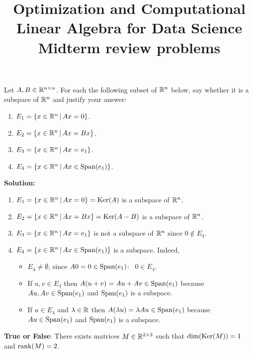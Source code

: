 \documentclass[11pt,nocut]{article}
\title{\vspace{-2.0cm}%
	Optimization and Computational Linear Algebra for Data Science\\
Midterm review problems}
\date{}
\begin{document}
\maketitle


\begin{problem}
	Let $A,B \in \mathbb{R}^{n \times n}$. For each the following subset of $\mathbb{R}^n$ below, say whether it is a subspace of $\mathbb{R}^n$ and justify your answer:
	\begin{enumerate}
		\item $E_1 = \{ x \in \mathbb{R}^n \, | \, Ax = 0 \}$.
		\item $E_2 = \{ x \in \mathbb{R}^n \, | \, Ax = Bx \}$.
		\item $E_3 = \{ x \in \mathbb{R}^n \, | \, Ax = e_1 \}$.
		\item $E_4 = \{ x \in \mathbb{R}^n \, | \, Ax \in {{\rm Span}}(e_1) \}$.
	\end{enumerate}
\end{problem}

\textbf{Solution:}
	\begin{enumerate}
		\item $E_1 = \{ x \in \mathbb{R}^n \, | \, Ax = 0 \} = {{\rm Ker}}(A)$ is a subspace of $\mathbb{R}^n$.
		\item $E_2 = \{ x \in \mathbb{R}^n \, | \, Ax = Bx \}= {{\rm Ker}}(A-B)$ is a subspace of $\mathbb{R}^n$.
		\item $E_3 = \{ x \in \mathbb{R}^n \, | \, Ax = e_1 \}$ is not a subspace of $\mathbb{R}^n$ since $0 \not\in E_3$.
		\item $E_4 = \{ x \in \mathbb{R}^n \, | \, Ax \in {{\rm Span}}(e_1) \}$ is a subspace. Indeed, 
			\begin{itemize}
				\item $E_4 \neq \emptyset$, since $A0 = 0 \in {{\rm Span}}(e_1)$: \ $0 \in E_4$.
				\item If $u,v \in E_4$ then $A(u+v) = Au + Av \in {{\rm Span}}(e_1)$ because $Au, Av \in {{\rm Span}}(e_1)$ and ${{\rm Span}}(e_1)$ is a subspace.
				\item If $u\in E_4$ and $\lambda \in \mathbb{R}$ then $A(\lambda u) = \lambda Au \in {{\rm Span}}(e_1)$ because $Au \in {{\rm Span}}(e_1)$ and ${{\rm Span}}(e_1)$ is a subspace.
			\end{itemize}
	\end{enumerate}

\vspace{0.2cm}

\begin{problem}
	\textbf{True or False}: There exists matrices $M \in \mathbb{R}^{2 \times 3}$ such that ${{\rm dim}}({{\rm Ker}}(M))=1$ and ${{\rm rank}}(M)=2$.
\end{problem}
\end{document}

